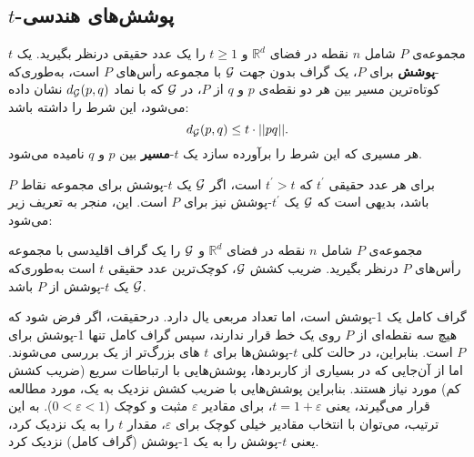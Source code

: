 \subsection{$t$-پوشش‌های هندسی}
 \begin{definition}
\label{def-t-spanner}
مجموعه‌ی $P$ شامل $n$ نقطه در فضای $\mathbb{R}^d$ و $t \geq 1$ را یک عدد حقیقی درنظر بگیرید. یک $t$-\textbf{پوشش} برای $P$، یک گراف بدون ‌جهت $\cal G$ با مجموعه رأس‌های $P$  است، به‌طوری‌که کوتاه‌ترین مسیر بین هر دو نقطه‌ی $p$ و $q$ از $P$،  در $\cal G$ که با نماد $d_{\cal G}(p, q)$ نشان داده می‌شود، این شرط را داشته باشد:
$$d_{\cal G}(p, q) \leq t \cdot ||pq||.$$ هر مسیری که این شرط را برآورده سازد یک $t$-\textbf{مسیر} بین $p$ و $q$ نامیده می‌شود.
\end{definition}
 برای هر عدد حقیقی $t^{'}$ که $t^{'} > t$ است، اگر $\cal G$ یک $t$-پوشش برای مجموعه نقاط $P$  باشد، بدیهی است که $\cal G$ یک $t^{'}$-پوشش نیز برای $P$ است. این، منجر به تعریف زیر می‌شود:
 \begin{definition}
\label{def-strtch-factor}
مجموعه‌ی $P$ شامل $n$ نقطه در فضای $\mathbb{R}^d$ و $\cal G$ را یک گراف اقلیدسی با مجموعه رأس‌های $P$ درنظر بگیرید. ضریب کشش $\cal G$، کوچک‌ترین عدد حقیقی $t$ است به‌طوری‌که $\cal G$ یک $t$-پوشش از $P$ باشد.
\end{definition}
گراف کامل یک 1-پوشش است، اما تعداد مربعی یال دارد. درحقیقت، اگر فرض شود که هیچ سه نقطه‌ای از $P$  روی یک خط قرار ندارند، سپس گراف کامل تنها 1-پوشش برای $P$ است. بنابراین، در حالت کلی $t$-پوشش‌ها برای $t$ های بزرگ‌تر از یک بررسی می‌شوند. اما از آن‌جایی که در بسیاری از کاربردها، پوشش‌هایی با ارتباطات سریع (ضریب کشش کم) مورد نیاز هستند. بنابراین پوشش‌هایی با ضریب کشش نزدیک به یک، مورد مطالعه قرار می‌گیرند، یعنی $t = 1 + \varepsilon$،  برای مقادیر $\varepsilon$ مثبت و کوچک ($0 < \varepsilon < 1$). به این ترتیب، می‌توان با انتخاب مقادیر خیلی کوچک برای $\varepsilon$، مقدار $t$ را به یک نزدیک کرد، یعنی $t$-پوشش را به یک $1$-پوشش (گراف کامل) نزدیک کرد.

